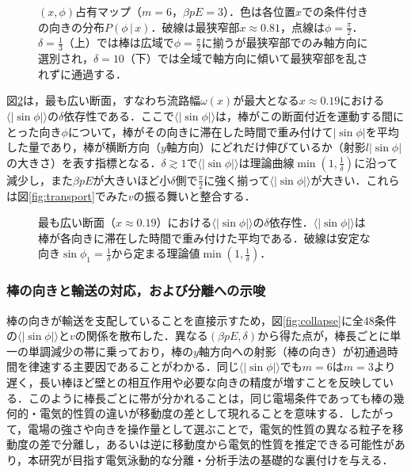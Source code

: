 \documentclass[dvipdfmx]{ampbt}
\begin{document}
  \begin{figure}[H]
    \centering
    
    \caption{$(x,\phi)$占有マップ（$m=6$，$\beta pE=3$）．色は各位置$x$での条件付きの向きの分布$P(\phi\,|\,x)$．破線は最狭窄部$x\approx0.81$，点線は$\phi=\frac{\pi}{2}$．$\delta=\frac{1}{3}$（上）では棒は広域で$\phi=\frac{\pi}{2}$に揃うが最狭窄部でのみ軸方向に選別され，$\delta=10$（下）では全域で軸方向に傾いて最狭窄部を乱されずに通過する．}
    \label{fig:xphi}
  \end{figure}

  図\ref{fig:orientation}は，最も広い断面，すなわち流路幅$\omega(x)$が最大となる$x\approx0.19$における$\langle|\sin\phi|\rangle$の$\delta$依存性である．ここで$\langle|\sin\phi|\rangle$は，棒がこの断面付近を運動する間にとった向き$\phi$について，棒がその向きに滞在した時間で重み付けて$|\sin\phi|$を平均した量であり，棒が横断方向（$y$軸方向）にどれだけ伸びているか（射影$l|\sin\phi|$の大きさ）を表す指標となる．$\delta\gtrsim1$で$\langle|\sin\phi|\rangle$は理論曲線$\min(1,\frac{1}{\delta})$に沿って減少し，また$\beta pE$が大きいほど小$\delta$側で$\frac{\pi}{2}$に強く揃って$\langle|\sin\phi|\rangle$が大きい．これらは図\ref{fig:transport}でみた$v$の振る舞いと整合する．

  \begin{figure}[H]
    \centering
    
    \caption{最も広い断面（$x\approx0.19$）における$\langle|\sin\phi|\rangle$の$\delta$依存性．$\langle|\sin\phi|\rangle$は棒が各向きに滞在した時間で重み付けた平均である．破線は安定な向き$\sin\phi_1=\frac{1}{\delta}$から定まる理論値$\min(1,\frac{1}{\delta})$．}
    \label{fig:orientation}
  \end{figure}

  \subsubsection{棒の向きと輸送の対応，および分離への示唆}
  棒の向きが輸送を支配していることを直接示すため，図\ref{fig:collapse}に全48条件の$\langle|\sin\phi|\rangle$と$v$の関係を散布した．異なる$(\beta pE,\delta)$から得た点が，棒長ごとに単一の単調減少の帯に乗っており，棒の$y$軸方向への射影（棒の向き）が初通過時間を律速する主要因であることがわかる．同じ$\langle|\sin\phi|\rangle$でも$m=6$は$m=3$より遅く，長い棒ほど壁との相互作用や必要な向きの精度が増すことを反映している．このように棒長ごとに帯が分かれることは，同じ電場条件であっても棒の幾何的・電気的性質の違いが移動度の差として現れることを意味する．したがって，電場の強さや向きを操作量として選ぶことで，電気的性質の異なる粒子を移動度の差で分離し，あるいは逆に移動度から電気的性質を推定できる可能性があり，本研究が目指す電気泳動的な分離・分析手法の基礎的な裏付けを与える．
\end{document}
